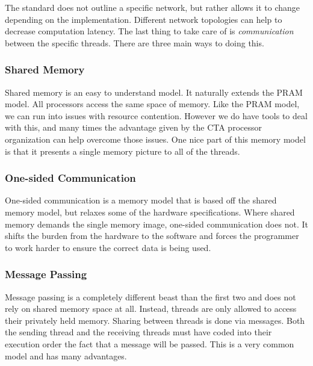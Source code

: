 \documentclass{article}
\begin{document}
	The standard does not outline a specific network, but rather allows it to change depending on the implementation. Different network topologies can help to decrease computation latency. The last thing to take care of is {\it communication} between the specific threads. There are three main ways to doing this.

      \subsubsection{Shared Memory}
      Shared memory is an easy to understand model. It naturally extends the PRAM model. All processors access the same space of memory. Like the PRAM model, we can run into issues with resource contention. However we do have tools to deal with this, and many times the advantage given by the CTA processor organization can help overcome those issues. One nice part of this memory model is that it presents a single memory picture to all of the threads.\done{}

      \subsubsection{One-sided Communication}
      One-sided communication is a memory model that is based off the shared memory model, but relaxes some of the hardware specifications. Where shared memory demands the single memory image, one-sided communication does not. It shifts the burden from the hardware to the software and forces the programmer to work harder to ensure the correct data is being used. \done{}

      \subsubsection{Message Passing}
      Message passing is a completely different beast than the first two and does not rely on shared memory space at all. \done{}Instead, threads are only allowed to access their privately held memory. Sharing between threads is done via messages. Both the sending thread and the receiving threads must have coded into their execution order the fact that a message will be passed. This is a very common model and has many advantages.
\end{document}
